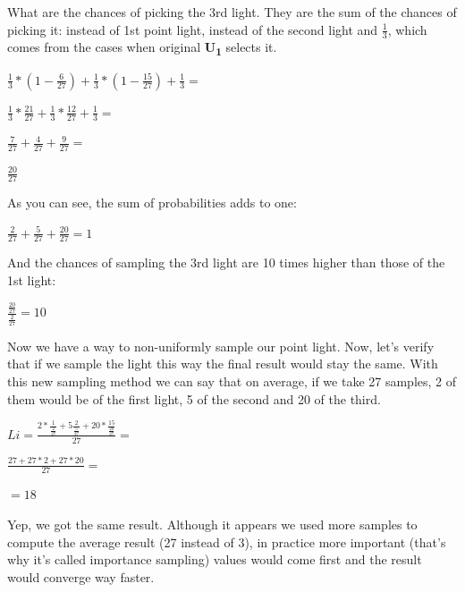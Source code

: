 \documentclass{article}
\begin{document}
What are the chances of picking the 3rd light.
They are the sum of the chances of picking it: instead of 1st point light, instead of the second light and  $\frac{1}{3}$, which comes from the cases when original \textbf{U\textsubscript{1}} selects it.

$\frac{1}{3} * (1 - \frac{6}{27}) + \frac{1}{3} * (1 - \frac{15}{27}) + \frac{1}{3} = $

$\frac{1}{3} * \frac{21}{27} + \frac{1}{3} * \frac{12}{27} + \frac{1}{3} = $

$\frac{7}{27} + \frac{4}{27} + \frac{9}{27} = $

$\frac{20}{27}$

As you can see, the sum of probabilities adds to one:

$\frac{2}{27} + \frac{5}{27} + \frac{20}{27} = 1$

And the chances of sampling the 3rd light are 10 times higher than those of the 1st light:

$\frac{\frac{20}{27}}{\frac{2}{27}} = 10$

Now we have a way to non-uniformly sample our point light.
Now, let's verify that if we sample the light this way the final result would stay the same.
With this new sampling method we can say that on average, if we take 27 samples, 2 of them would be of the first light, 5 of the second and 20 of the third.

$Li = \frac{2 * \frac{1}{\frac{2}{27}} + 5 \frac{2}{\frac{5}{27}} + 20 * \frac{15}{\frac{20}{27}}}{27} =$

$\frac{27 + 27 * 2 + 27 * 20}{27} = $

$ = 18$

Yep, we got the same result. Although it appears we used more samples to compute the average result (27 instead of 3),
in practice more important (that's why it's called importance sampling) values would come first
and the result would converge way faster.
\end{document}
